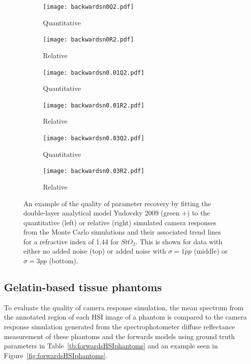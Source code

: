 \begin{figure}[h!]
    \centering
    \begin{subfigure}{0.49\textwidth}
        \texttt{[image: backwardsn0Q2.pdf]}
        \caption{Quantitative}
        \label{fig:backwardsn0Q2}
    \end{subfigure}
    \begin{subfigure}{0.49\textwidth}
        \texttt{[image: backwardsn0R2.pdf]}
        \caption{Relative}
        \label{fig:backwardsn0R2}
    \end{subfigure}
    \begin{subfigure}{0.49\textwidth}
        \texttt{[image: backwardsn0.01Q2.pdf]}
        \caption{Quantitative}
        \label{fig:backwardsn0.01Q2}
    \end{subfigure}
    \begin{subfigure}{0.49\textwidth}
        \texttt{[image: backwardsn0.01R2.pdf]}
        \caption{Relative}
        \label{fig:backwardsm0.01R2}
    \end{subfigure}
    \begin{subfigure}{0.49\textwidth}
        \texttt{[image: backwardsn0.03Q2.pdf]}
        \caption{Quantitative}
        \label{fig:backwardsn0.03Q2}
    \end{subfigure}
    \begin{subfigure}{0.49\textwidth}
        \texttt{[image: backwardsn0.03R2.pdf]}
        \caption{Relative}
        \label{fig:backwardsm0.03R2}
    \end{subfigure}
    \caption{An example of the quality of parameter recovery by fitting the double-layer analytical model Yudovsky 2009 (\textcolor{MyGreen}{green $+$}) to the quantitative (left) or relative (right) simulated camera responses from the Monte Carlo simulations and their associated trend lines for a refractive index of 1.44 for $StO_2$. This is shown for data with either no added noise (top) or added noise with $\sigma = 1pp$ (middle) or $\sigma = 3pp$ (bottom).}
    \label{fig:backwardsHSIMC2}
\end{figure}
\FloatBarrier

\subsection{Gelatin-based tissue phantoms}
To evaluate the quality of camera response simulation, the mean spectrum from the annotated region of each HSI image of a phantom is compared to the camera response simulation generated from the spectrophotometer diffuse reflectance measurement of these phantoms and the forwards models using ground truth parameters in Table~\ref{tb:forwardsHSIphantoms} and an example seen in Figure~\ref{fig:forwardsHSIphantoms}. 

